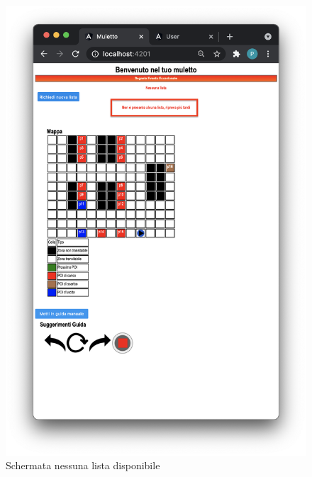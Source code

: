 \begin{itemize}
\begin{figure}[H]
        \centering
        \includegraphics[scale=0.45]{res/images/nolist.png}
        \caption{Schermata nessuna lista disponibile}
    \end{figure}
\end{itemize}



